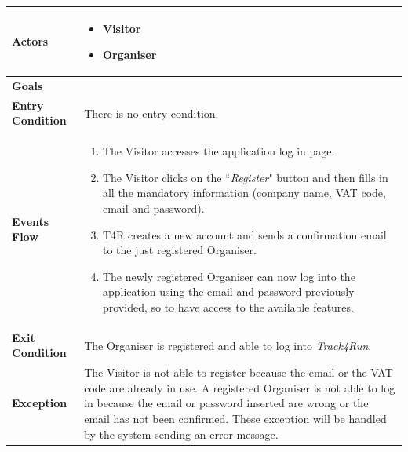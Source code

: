             \begin{table}[H]
            	\centering
                
                \begin{tabular}{|p{3cm}|p{8.2cm}|}
                    \hline
                    \textbf{Actors} & \begin{itemize}
                        \item Visitor
                        \item Organiser
                    \end{itemize} \\
                     \hline
                    \textbf{Goals} & \\ 
                     \hline
                    \textbf{Entry Condition} & There is no entry condition. \\
                     \hline
                    \textbf{Events Flow} & \begin{enumerate}
                                               \item The Visitor accesses the application log in page.
                                               \item The Visitor clicks on the ``\emph{Register}" button and then fills in all the mandatory information (company name, VAT code, email and password).
                                               \item T4R creates a new account and sends a confirmation email to the just registered Organiser.
                                               \item The newly registered Organiser can now log into the application using the email and password previously provided, so to have access to the available features.
                                           \end{enumerate} \\
                     \hline
                    \textbf{Exit Condition} & The Organiser is registered and able to log into                                \emph{Track4Run}. \\
                     \hline
                    \textbf{Exception} & The Visitor is not able to register because the email or the VAT code                      are already in use. \newline
                                         A registered Organiser is not able to log in because the email or password inserted are wrong or the email has not been confirmed. \newline
                                         These exception will be handled by the system sending an error message. \\
                                         \hline
                \end{tabular}  
            \end{table}
            
